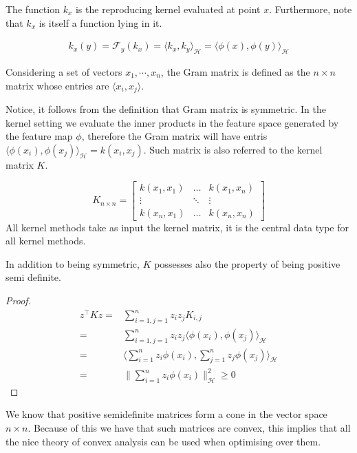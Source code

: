The function $k_{x}$ is the reproducing kernel evaluated at point $x$.
Furthermore, note that $k_{x}$ is itself a function lying in it.

\begin{align*}
    k_{x}(y)=\mathcal{F}_{y}(k_{x})=\langle k_{x}, k_{y}\rangle_{\mathcal{H}}=\langle \phi(x), \phi(y)\rangle_{\mathcal{H}}
\end{align*}



\begin{definition}
    Considering a set of vectors $x_1, \cdots, x_n$, the Gram matrix is defined as the $n\times n$ matrix whose entries are $\langle x_i, x_j \rangle$.    
\end{definition}

Notice, it follows from the definition that Gram matrix is symmetric.
In the kernel setting we evaluate the inner products in the feature space generated by the feature map $\phi$, therefore the Gram matrix will have entris $\langle \phi(x_i), \phi(x_j) \rangle_{\mathcal{H}}= k(x_i, x_j)$. Such matrix is also referred to the kernel matrix $K$.

\[
K_{n\times n}=
\begin{bmatrix}
    k(x_1,x_1)       &  \dots & k(x_1,x_n) \\
    \vdots       & \ddots & \vdots \\
    k(x_n, x_1)       & \dots & k(x_n, x_n)
\end{bmatrix}
\]
All kernel methods take as input the kernel matrix, it is the central data type for all 
kernel methods.

\begin{proposition}
    In addition to being symmetric, $K$ possesses also the property of being positive semi definite.    
\end{proposition}

\begin{proof}
    \begin{align}
        z^\intercal K z =& \sum_{i=1,j=1}^n z_i z_j K_{i,j}
        \\
        =& \sum_{i=1,j=1}^n z_i z_j \langle \phi(x_i), \phi(x_j) \rangle_{\mathcal{H}}
        \\
        =& \langle \sum_{i=1}^n z_i \phi(x_i), \sum_{j=1}^n z_j \phi(x_j)\rangle_{\mathcal{H}}
        \\
        =& \|\sum_{i=1}^n z_i \phi(x_i) \|_{\mathcal{H}}^2 \geq 0
    \end{align}
\end{proof}
We know that positive semidefinite matrices form a cone in the vector space $n\times n$. Because of this we have that such matrices are convex, this implies that all the nice theory of convex analysis can be used when optimising over them.


